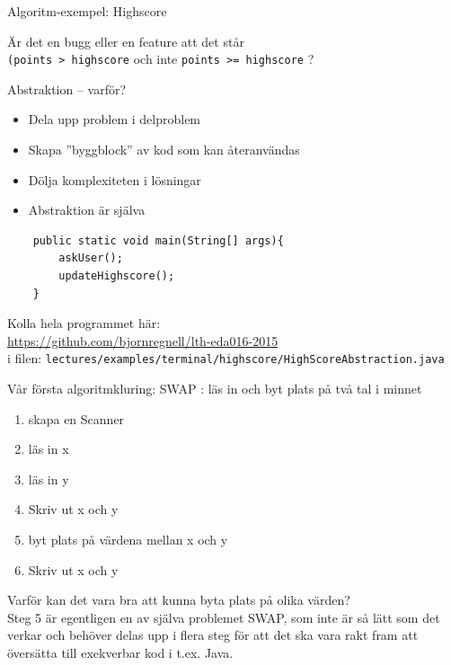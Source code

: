 \documentclass{lecturenotes}
\begin{document}
\begin{Slide}{Algoritm-exempel: Highscore}

Är det en bugg eller en feature att det står\\ \texttt{(points > highscore} och inte \texttt{points >= highscore} ?
\end{Slide}

\begin{Slide}{Abstraktion -- varför?}
\begin{itemize}
\item Dela upp problem i delproblem
\item Skapa ''byggblock'' av kod som kan återanvändas
\item Dölja komplexiteten i lösningar
\item Abstraktion är själva 
\end{itemize}
\begin{lstlisting}
    public static void main(String[] args){
    	askUser();
    	updateHighscore();
    }
\end{lstlisting}
Kolla hela programmet här:\\ \href{https://github.com/bjornregnell/lth-eda016-2015/blob/master/lectures/examples/terminal/highscore/HighScoreAbstraction.java}{https://github.com/bjornregnell/lth-eda016-2015} \\
i filen: \scriptsize\texttt{lectures/examples/terminal/highscore/HighScoreAbstraction.java}
\end{Slide}

\begin{Slide}{Vår första algoritmkluring: SWAP}
: läs in och byt plats på två tal i minnet \\ \vspace{1em}
\pause
{}
\begin{enumerate}
\item skapa en Scanner
\item  läs in x
\item  läs in y
\item  Skriv ut x och y
\item  byt plats på värdena mellan x och y
\item  Skriv ut x och y
\end{enumerate}
\vspace{2em}
\footnotesize Varför kan det vara bra att kunna byta plats på olika värden? \\ \vspace{1em}\scriptsize
Steg 5 är egentligen en  av själva problemet SWAP, som inte är så lätt som det verkar och behöver delas upp i flera steg för att det ska vara rakt fram att översätta till exekverbar kod i t.ex. Java.
\end{Slide}
\end{document}
